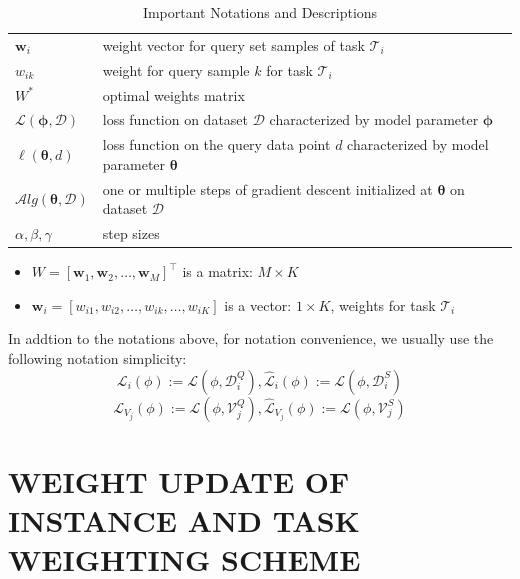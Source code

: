 {\begin{table}[ht!]
\begin{center}
\begin{tabular}{ll}
        $\mathbf{w}_i$ & weight vector for query set samples of task $\mathcal{T}_i$\\
        $w_{ik}$ & weight for query sample $k$ for task $\mathcal{T}_i$\\
        $W^*$ & optimal weights matrix\\
        $\mathcal{L}(\boldsymbol{\phi}, \mathcal{D})$ & loss function on dataset $\mathcal{D}$ characterized by model parameter $\boldsymbol{\phi}$ \\
        $\ell(\boldsymbol{\theta}, d)$ & loss function on the query data point $d$ characterized by model parameter $\boldsymbol{\theta}$\\
        $\mathcal{A}lg(\boldsymbol{\theta}, \mathcal{D})$ & one or multiple steps of gradient descent initialized at $\boldsymbol{\theta}$ on dataset $\mathcal{D}$\\
        $\alpha, \beta, \gamma$ & step sizes \\
        \bottomrule
    \end{tabular}
\end{center}
\caption{Important Notations and Descriptions} \label{tab:notation}
\end{table}
}

\begin{itemize}
    \item $W=[\mathbf{w}_1,\mathbf{w}_2,\dots,\mathbf{w}_M]^{\intercal}$ is a matrix: $M \times K$
    \item $\mathbf{w}_i = [w_{i1},w_{i2},\dots, w_{ik}, \dots, w_{iK}]$ is a vector: $1 \times K$, weights for task $\mathcal{T}_i$
\end{itemize}

In addtion to the notations above, for notation convenience, we usually use the following notation simplicity:
$$
\mathcal{L}_i(\phi) := \mathcal{L}(\phi, \mathcal{D}_i^{Q}), \widehat{\mathcal{L}}_i(\phi) := \mathcal{L}(\phi, \mathcal{D}_i^{S})
$$
$$
\mathcal{L}_{V_j}(\phi) := \mathcal{L}(\phi, \mathcal{V}_j^{Q}), \widehat{\mathcal{L}}_{V_j}(\phi) := \mathcal{L}(\phi, \mathcal{V}_j^{S})
$$


\section{WEIGHT UPDATE OF INSTANCE AND TASK WEIGHTING SCHEME}
\label{app:Lemma1proofs}
